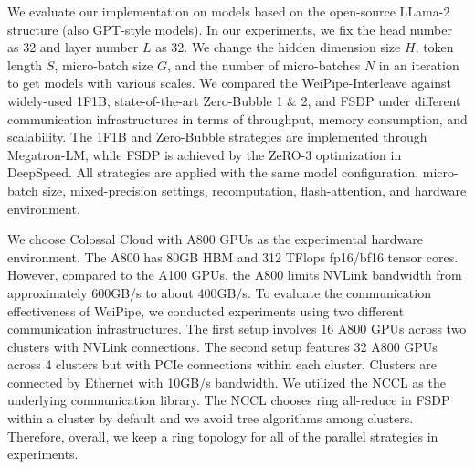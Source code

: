 \documentclass[sigplan,review]{acmart}
\begin{document}
We evaluate our implementation on models based on the open-source LLama-2 structure\cite{touvron2023llama2openfoundation} (also GPT-style models). In our experiments, we fix the head number as 32 and layer number $L$ as 32. We change the hidden dimension size $H$, token length $S$, micro-batch size $G$, and the number of micro-batches $N$ in an iteration to get models with various scales. We compared the WeiPipe-Interleave against widely-used 1F1B, state-of-the-art Zero-Bubble 1 \& 2, and FSDP under different communication infrastructures in terms of throughput, memory consumption, and scalability. The 1F1B and Zero-Bubble strategies are implemented through Megatron-LM, while FSDP is achieved by the ZeRO-3 optimization in DeepSpeed. All strategies are applied with the same model configuration, micro-batch size, mixed-precision settings, recomputation, flash-attention, and hardware environment.


We choose Colossal Cloud with A800 GPUs as the experimental hardware environment. The A800 has 80GB HBM and 312 TFlops fp16/bf16 tensor cores. However, compared to the A100 GPUs, the A800 limits NVLink bandwidth from approximately 600GB/s to about 400GB/s. To evaluate the communication effectiveness of WeiPipe, we conducted experiments using two different communication infrastructures. The first setup involves 16 A800 GPUs across two clusters with NVLink\cite{nvlink} connections. The second setup features 32 A800 GPUs across 4 clusters but with PCIe connections within each cluster. Clusters are connected by Ethernet with 10GB/s bandwidth. We utilized the NCCL as the underlying communication library. The NCCL chooses ring all-reduce in FSDP within a cluster by default and we avoid tree algorithms among clusters. Therefore, overall, we keep a ring topology for all of the parallel strategies in experiments.
\end{document}
